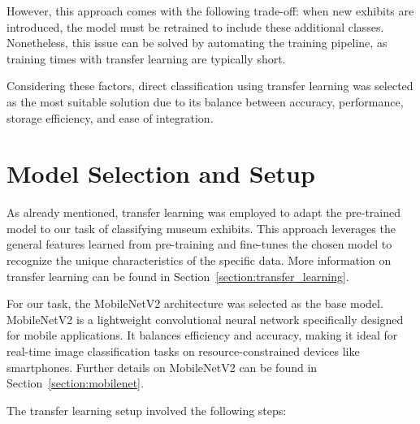 However, this approach comes with the following trade-off: when new exhibits are introduced, the model must be retrained to include these additional classes. Nonetheless, this issue can be solved by automating the training pipeline, as training times with transfer learning are typically short.

Considering these factors, direct classification using transfer learning was selected as the most suitable solution due to its balance between accuracy, performance, storage efficiency, and ease of integration.

\section{Model Selection and Setup}

As already mentioned, transfer learning was employed to adapt the pre-trained model to our task of classifying museum exhibits. This approach leverages the general features learned from pre-training and fine-tunes the chosen model to recognize the unique characteristics of the specific data. More information on transfer learning can be found in Section~\ref{section:transfer_learning}.

For our task, the MobileNetV2 architecture was selected as the base model. MobileNetV2 is a lightweight convolutional neural network specifically designed for mobile applications. It balances efficiency and accuracy, making it ideal for real-time image classification tasks on resource-constrained devices like smartphones. Further details on MobileNetV2 can be found in Section~\ref{section:mobilenet}.

The transfer learning setup involved the following steps:

